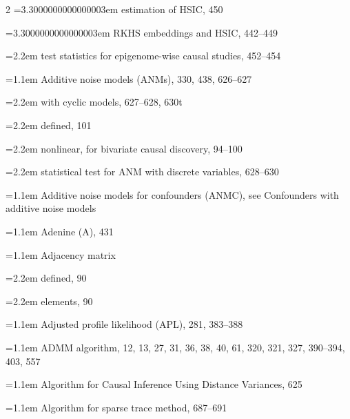 \begin{multicols}{2}
\noindent\hangindent=3.3000000000000003em \hspace*{2.2em}estimation of HSIC, 450\par
\noindent\hangindent=3.3000000000000003em \hspace*{2.2em}RKHS embeddings and HSIC, 442--449\par
\noindent\hangindent=2.2em \hspace*{1.1em}test statistics for epigenome-wise causal studies, 452--454\par
\noindent\hangindent=1.1em Additive noise models (ANMs), 330, 438, 626--627\par
\noindent\hangindent=2.2em \hspace*{1.1em}with cyclic models, 627--628, 630t\par
\noindent\hangindent=2.2em \hspace*{1.1em}defined, 101\par
\noindent\hangindent=2.2em \hspace*{1.1em}nonlinear, for bivariate causal discovery, 94--100\par
\noindent\hangindent=2.2em \hspace*{1.1em}statistical test for ANM with discrete variables, 628--630\par
\noindent\hangindent=1.1em Additive noise models for confounders (ANMC), see Confounders with additive noise models\par
\noindent\hangindent=1.1em Adenine (A), 431\par
\noindent\hangindent=1.1em Adjacency matrix\par
\noindent\hangindent=2.2em \hspace*{1.1em}defined, 90\par
\noindent\hangindent=2.2em \hspace*{1.1em}elements, 90\par
\noindent\hangindent=1.1em Adjusted profile likelihood (APL), 281, 383--388\par
\noindent\hangindent=1.1em ADMM algorithm, 12, 13, 27, 31, 36, 38, 40, 61, 320, 321, 327, 390--394, 403, 557\par
\noindent\hangindent=1.1em Algorithm for Causal Inference Using Distance Variances, 625\par
\noindent\hangindent=1.1em Algorithm for sparse trace method, 687--691\par

\end{multicols}
